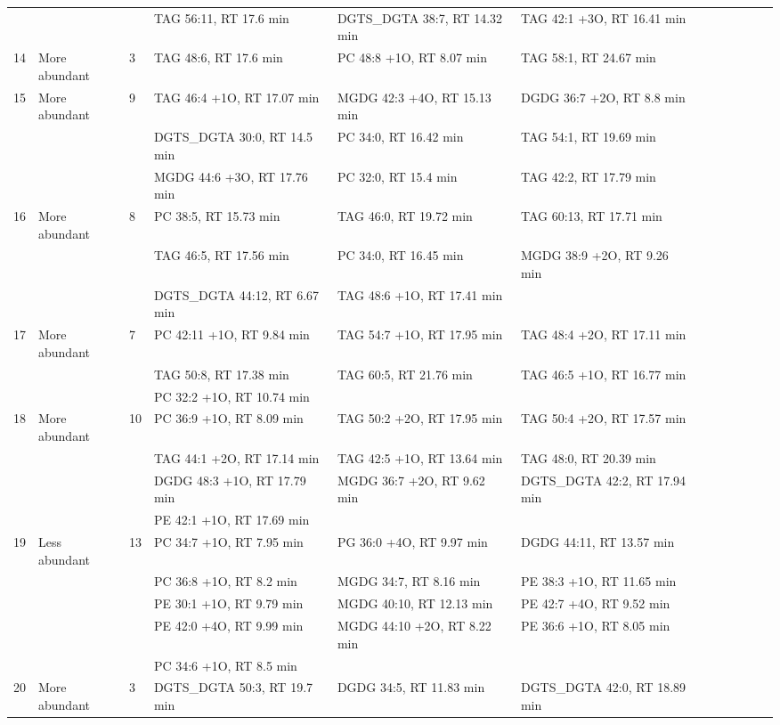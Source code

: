 \begin{landscape}
\begin{footnotesize}
\begin{singlespace}
\begin{flushleft}
\begin{longtable}{ Lp{.03\linewidth} Lp{.12\linewidth} Lp{.03\linewidth} Lp{.24\linewidth} Lp{.24\linewidth} Lp{.24\linewidth} }
 &  &  & TAG 56:11, RT 17.6 min & DGTS\_DGTA 38:7, RT 14.32 min & TAG 42:1 +3O, RT 16.41 min \\
14 & More abundant & 3 & TAG 48:6, RT 17.6 min & PC 48:8 +1O, RT 8.07 min & TAG 58:1, RT 24.67 min \\
15 & More abundant & 9 & TAG 46:4 +1O, RT 17.07 min & MGDG 42:3 +4O, RT 15.13 min & DGDG 36:7 +2O, RT 8.8 min \\
 &  &  & DGTS\_DGTA 30:0, RT 14.5 min & PC 34:0, RT 16.42 min & TAG 54:1, RT 19.69 min \\
 &  &  & MGDG 44:6 +3O, RT 17.76 min & PC 32:0, RT 15.4 min & TAG 42:2, RT 17.79 min \\
16 & More abundant & 8 & PC 38:5, RT 15.73 min & TAG 46:0, RT 19.72 min & TAG 60:13, RT 17.71 min \\
 &  &  & TAG 46:5, RT 17.56 min & PC 34:0, RT 16.45 min & MGDG 38:9 +2O, RT 9.26 min \\
 &  &  & DGTS\_DGTA 44:12, RT 6.67 min & TAG 48:6 +1O, RT 17.41 min &  \\
17 & More abundant & 7 & PC 42:11 +1O, RT 9.84 min & TAG 54:7 +1O, RT 17.95 min & TAG 48:4 +2O, RT 17.11 min \\
 &  &  & TAG 50:8, RT 17.38 min & TAG 60:5, RT 21.76 min & TAG 46:5 +1O, RT 16.77 min \\
 &  &  & PC 32:2 +1O, RT 10.74 min &  &  \\
18 & More abundant & 10 & PC 36:9 +1O, RT 8.09 min & TAG 50:2 +2O, RT 17.95 min & TAG 50:4 +2O, RT 17.57 min \\
 &  &  & TAG 44:1 +2O, RT 17.14 min & TAG 42:5 +1O, RT 13.64 min & TAG 48:0, RT 20.39 min \\
 &  &  & DGDG 48:3 +1O, RT 17.79 min & MGDG 36:7 +2O, RT 9.62 min & DGTS\_DGTA 42:2, RT 17.94 min \\
 &  &  & PE 42:1 +1O, RT 17.69 min &  &  \\
19 & Less abundant & 13 & PC 34:7 +1O, RT 7.95 min & PG 36:0 +4O, RT 9.97 min & DGDG 44:11, RT 13.57 min \\
 &  &  & PC 36:8 +1O, RT 8.2 min & MGDG 34:7, RT 8.16 min & PE 38:3 +1O, RT 11.65 min \\
 &  &  & PE 30:1 +1O, RT 9.79 min & MGDG 40:10, RT 12.13 min & PE 42:7 +4O, RT 9.52 min \\
 &  &  & PE 42:0 +4O, RT 9.99 min & MGDG 44:10 +2O, RT 8.22 min & PE 36:6 +1O, RT 8.05 min \\
 &  &  & PC 34:6 +1O, RT 8.5 min &  &  \\
20 & More abundant & 3 & DGTS\_DGTA 50:3, RT 19.7 min & DGDG 34:5, RT 11.83 min & DGTS\_DGTA 42:0, RT 18.89 min \\

\end{longtable}
\end{flushleft}
\end{singlespace}
\end{footnotesize}
\end{landscape}
